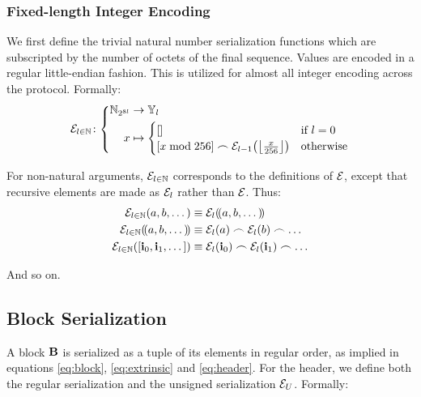 \subsubsection{Fixed-length Integer Encoding}
We first define the trivial natural number serialization functions which are subscripted by the number of octets of the final sequence. Values are encoded in a regular little-endian fashion. This is utilized for almost all integer encoding across the protocol. Formally:
\begin{equation}
  \fnencode[l \in \N]\colon\abracegroup{
    \Nbits{8l} &\to \bloboflen{l} \\
    x &\mapsto \begin{cases}
      \sq{} &\when l = 0 \\
      \sq{x \bmod 256} \concat \encode[l - 1]{\floor{\frac{x}{256}}} &\otherwise
    \end{cases}
  }
\end{equation}

For non-natural arguments, $\fnencode[l \in \N]$ corresponds to the definitions of $\fnencode$, except that recursive elements are made as $\fnencode[l]$ rather than $\fnencode$. Thus:
\begin{align}
  \encode[l \in \N]{a, b, \dots} &\equiv \encode[l]{\tup{a, b, \dots}}\\
  \encode[l \in \N]{\tup{a, b, \dots}} &\equiv \encode[l]{a} \concat \encode[l]{b} \concat \dots\\
  \encode[l \in \N]{\sq{\mathbf{i}_0, \mathbf{i}_1, \dots}} &\equiv \encode[l]{\mathbf{i}_0} \concat \encode[l]{\mathbf{i}_1} \concat \dots
\end{align}

And so on.

\subsection{Block Serialization}

A block $\block$ is serialized as a tuple of its elements in regular order, as implied in equations \ref{eq:block}, \ref{eq:extrinsic} and \ref{eq:header}. For the header, we define both the regular serialization and the unsigned serialization $\fnencodeunsignedheader$. Formally:

